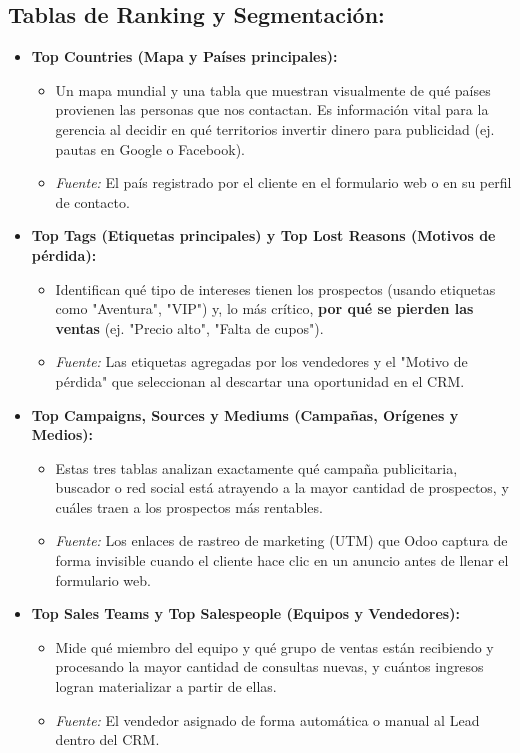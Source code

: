 \documentclass[11pt,a4paper]{article}
\begin{document}
\subsection*{Tablas de Ranking y Segmentación:}
\begin{itemize}[leftmargin=*]
    \item \textbf{Top Countries (Mapa y Países principales):}
    \begin{itemize}
        \item Un mapa mundial y una tabla que muestran visualmente de qué países provienen las personas que nos contactan. Es información vital para la gerencia al decidir en qué territorios invertir dinero para publicidad (ej. pautas en Google o Facebook).
        \item \textit{Fuente:} El país registrado por el cliente en el formulario web o en su perfil de contacto.
    \end{itemize}
    \item \textbf{Top Tags (Etiquetas principales) y Top Lost Reasons (Motivos de pérdida):}
    \begin{itemize}
        \item Identifican qué tipo de intereses tienen los prospectos (usando etiquetas como "Aventura", "VIP") y, lo más crítico, \textbf{por qué se pierden las ventas} (ej. "Precio alto", "Falta de cupos").
        \item \textit{Fuente:} Las etiquetas agregadas por los vendedores y el "Motivo de pérdida" que seleccionan al descartar una oportunidad en el CRM.
    \end{itemize}
    \item \textbf{Top Campaigns, Sources y Mediums (Campañas, Orígenes y Medios):}
    \begin{itemize}
        \item Estas tres tablas analizan exactamente qué campaña publicitaria, buscador o red social está atrayendo a la mayor cantidad de prospectos, y cuáles traen a los prospectos más rentables.
        \item \textit{Fuente:} Los enlaces de rastreo de marketing (UTM) que Odoo captura de forma invisible cuando el cliente hace clic en un anuncio antes de llenar el formulario web.
    \end{itemize}
    \item \textbf{Top Sales Teams y Top Salespeople (Equipos y Vendedores):}
    \begin{itemize}
        \item Mide qué miembro del equipo y qué grupo de ventas están recibiendo y procesando la mayor cantidad de consultas nuevas, y cuántos ingresos logran materializar a partir de ellas.
        \item \textit{Fuente:} El vendedor asignado de forma automática o manual al Lead dentro del CRM.
    \end{itemize}
\end{itemize}
\end{document}
